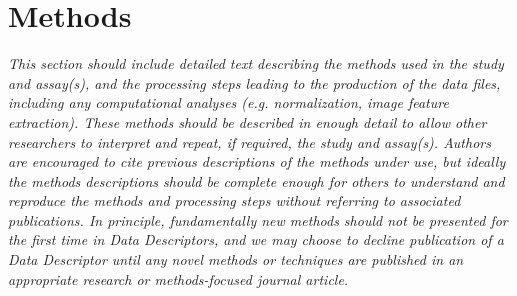 \section{Methods}
\textit{This section should include detailed text describing the methods used in the study and assay(s), and the processing steps leading to the production of the data files, including any computational analyses (e.g. normalization, image feature extraction). These methods should be described in enough detail to allow other researchers to interpret and repeat, if required, the study and assay(s).  Authors are encouraged to cite previous descriptions of the methods under use, but ideally the methods descriptions should be complete enough for others to understand and reproduce the methods and processing steps without referring to associated publications.  In principle, fundamentally new methods should not be presented for the first time in Data Descriptors, and we may choose to decline publication of a Data Descriptor until any novel methods or techniques are published in an appropriate research or methods-focused journal article.}

